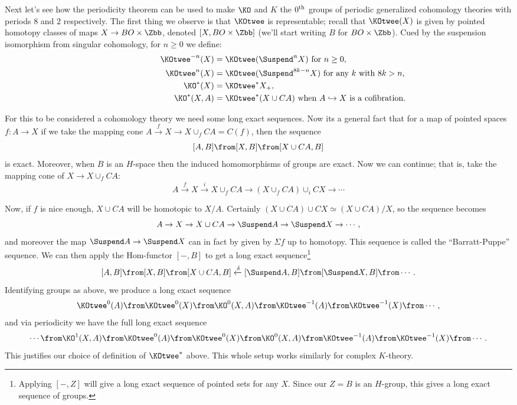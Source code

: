 Next let's see how the periodicity theorem can be used to make $\KO$ and $K$ the $0^\textup{th}$ groups of periodic generalized cohomology theories with periods $8$ and $2$ respectively.  The first thing we observe is that $\KOtwee$ is representable; recall that $\KOtwee(X)$ is given by pointed homotopy classes of maps $X \to BO \times \Zbb$, denoted $[X, BO \times \Zbb]$ (we'll start writing $B$ for $BO \times \Zbb$).  Cued by the suspension isomorphism from singular cohomology, for $n \ge 0$ we define:
\begin{align*}
\qquad\qquad\qquad
\KOtwee^{-n} (X) & = \KOtwee(\Suspend^n X)\hbox{\ for $n\geq0$}, \\
\KOtwee^n(X) & = \KOtwee(\Suspend^{8k-n}X) \hbox{\ for any $k$ with $8k > n$}, \\
\KO^*(X) &= \KOtwee^* X_+, \\
\KO^*(X, A) & = \KOtwee^*(X \cup CA) \textup{\ when $A\hookrightarrow X$ is a cofibration.}
\end{align*}

For this to be considered a cohomology theory we need some long exact sequences.  Now its a general fact that for a map of pointed spaces $f: A \to X$ if we take the mapping cone $A \xrightarrow{f} X \to X \cup_f CA = C(f)$, then the sequence
\[
[A, B] \from [X, B] \from [X \cup CA, B]
\]
is exact.  Moreover, when $B$ is an $H$-space then the induced homomorphisms of groups are exact.  Now we can continue; that is, take the mapping cone of $X \to X \cup_f CA$:
\[
A \xrightarrow{f} X \xrightarrow{i} X \cup_f CA \to (X \cup_f CA) \cup_i CX \to \cdots
\]

Now, if $f$ is nice enough, $X \cup CA$ will be homotopic to $X / A$.  Certainly $(X \cup CA) \cup CX \simeq (X \cup CA)/X$, so the sequence becomes
\[
A \to X \to X \cup CA \to \Suspend A \to \Suspend X \to \cdots
,\]
and moreover the map $\Suspend A \to \Suspend X$ can in fact by given by $\Sigma f$ up to homotopy.  This sequence is called the ``Barratt-Puppe'' sequence.  We can then apply the Hom-functor $[-, B]$ to get a long exact sequence\footnote{Applying $[-, Z]$ will give a long exact sequence of pointed sets for any $X$.  Since our $Z = B$ is an $H$-group, this gives a long exact sequence of groups.}
\[
[A, B] \from [X, B] \from [X \cup CA, B] \xleftarrow{\delta} [\Suspend A, B] \from [\Suspend X, B] \from \cdots
.\]
Identifying groups as above, we produce a long exact sequence
\[
\KOtwee^0 (A) \from \KOtwee^0(X) \from \KO^0(X, A) \from \KOtwee^{-1}(A) \from \KOtwee^{-1}(X) \from \cdots
,\]
and via periodicity we have the full long exact sequence
\[
\cdots \from \KO^1(X, A) \from \KOtwee^0 (A) \from \KOtwee^0(X) \from \KO^0(X, A) \from \KOtwee^{-1}(A) \from \KOtwee^{-1}(X) \from \cdots
.\]
This justifies our choice of definition of $\KOtwee^*$ above.  This whole setup works similarly for complex $K$-theory.

